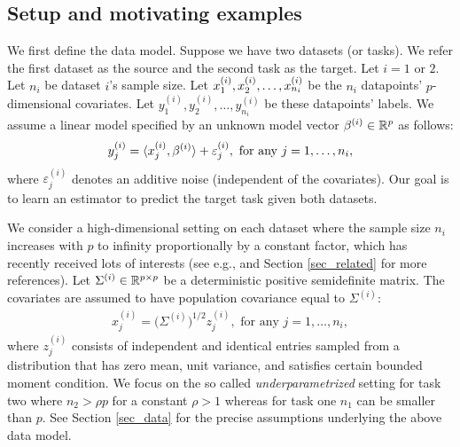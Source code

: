 \subsection{Setup and motivating examples}

We first define the data model.
Suppose we have two datasets (or tasks).
We refer the first dataset as the source and the second task as the target.
Let $i = 1$ or $2$.
Let $n_i$ be dataset $i$'s sample size.
Let $x_1^{(i)}, x_2^{\ss (i)}, \dots, x_{n_i}^{(i)}$ be the $n_i$ datapoints' $p$-dimensional covariates.
Let $y_1^{(i)}, y_2^{(i)}, \dots, y_{n_i}^{(i)}$ be these datapoints' labels.
We assume a linear model specified by an unknown model vector $\beta^{(i)} \in \real^p$ as follows:
\begin{align}
    y_j^{(i)} = \inner{x_j^{(i)}}{\beta^{(i)}} + \varepsilon_j^{(i)}, \text{ for any } j = 1,\dots,n_i, \label{eq_linear}
\end{align}
where $\varepsilon^{(i)}_j$ denotes an additive noise (independent of the covariates).
Our goal is to learn an estimator to predict the target task given both datasets.

We consider a high-dimensional setting on each dataset where the sample size $n_i$ increases with $p$ to infinity proportionally by a constant factor, which has recently received lots of interests (see e.g., \citet{hastie2019surprises} and Section \ref{sec_related} for more references).
Let $\Sigma^{(i)} \in \real^{p\times p}$ be a deterministic positive semidefinite matrix.
The covariates are assumed to have population covariance equal to $\Sigma^{(i)}$:
\begin{align}
    x_j^{(i)} = \big(\Sigma^{(i)}\big)^{1/2} z_{j}^{(i)}, \text{ for any } j = 1,\dots,n_i, \label{eq_rvm}
\end{align}
where $z_j^{(i)}$ consists of independent and identical entries sampled from a distribution that has zero mean, unit variance, and satisfies certain bounded moment condition. 
We focus on the so called \textit{underparametrized} setting for task two where $n_2 > \rho p$ for a constant $\rho > 1$ whereas for task one $n_1$ can be smaller than $p$.
See Section \ref{sec_data} for the precise assumptions underlying the above data model.

